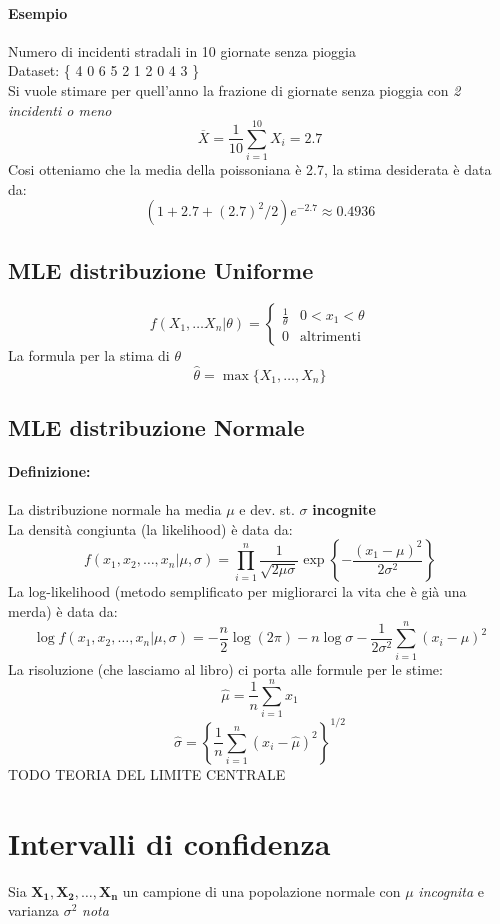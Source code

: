 \documentclass[]{article}
\newcommand{\definizione}{\paragraph{Definizione:}}
\begin{document}
    \paragraph{Esempio} Numero di incidenti stradali in 10 giornate senza pioggia \\
    Dataset: \{ 4 0 6 5 2 1 2 0 4 3 \} \\
    Si vuole stimare per quell'anno la frazione di giornate senza pioggia con \textit{2 incidenti o meno}
    \[ \overline{X} = \frac{1}{10} \sum_{i = 1}^{10} X_i = \boldsymbol{2.7} \]
    Cosi otteniamo che la media della poissoniana è 2.7, la stima desiderata è data da:
    \[ (1+2.7+ (2.7)^2 /2 ) e^{-2.7} \approx 0.4936 \]
    \subsection{MLE distribuzione Uniforme}
    \begin{equation*}
        f(X_1, \ldots X_n \rvert \theta) =
        \begin{cases}
            \frac{1}{\theta} & 0 < x_1 < \theta \\
            0 & \text{altrimenti}
        \end{cases}
    \end{equation*}
    La formula per la stima di $\theta$
    \[ \hat{\theta} = \max \{ X_1, \ldots, X_n \} \]
    \subsection{MLE distribuzione Normale} 
    \definizione La distribuzione normale ha media $\mu$ e dev. st. $\sigma$ \textbf{incognite} \\
    La densità congiunta (la likelihood) è data da:
    \[ f(x_1, x_2, \ldots, x_n \rvert \mu, \sigma) = \prod_{i= 1}^{n} \frac{1}{\sqrt{2 \mu \sigma}} \exp \left \{ - \frac{(x_1-\mu)^2}{2 \sigma^2} \right \} \]
    La log-likelihood (metodo semplificato per migliorarci la vita che è già una merda) è data da:
    \[ \log f(x_1, x_2, \ldots, x_n \rvert \mu, \sigma) = - \frac{n}{2} \log(2\pi) - n \log \sigma - \frac{1}{2\sigma^2} \sum_{i = 1}^{n} (x_i - \mu)^2 \]
    La risoluzione (che lasciamo al libro) ci porta alle formule per le stime:
    \[ \hat{\mu} = \frac{1}{n} \sum_{i = 1}^{n} x_1 \]
    \[ \hat{\sigma} = \left\{ \frac{1}{n} \sum_{i = 1}^{n}(x_i - \hat{\mu})^2 \right\}^{1/2} \]
    TODO TEORIA DEL LIMITE CENTRALE
    \section{Intervalli di confidenza}
    Sia $\boldsymbol{X_1, X_2, \ldots, X_n}$ un campione di una popolazione normale con $\mu$ \textit{incognita} e varianza $\sigma^2$ \textit{nota}
\end{document}
